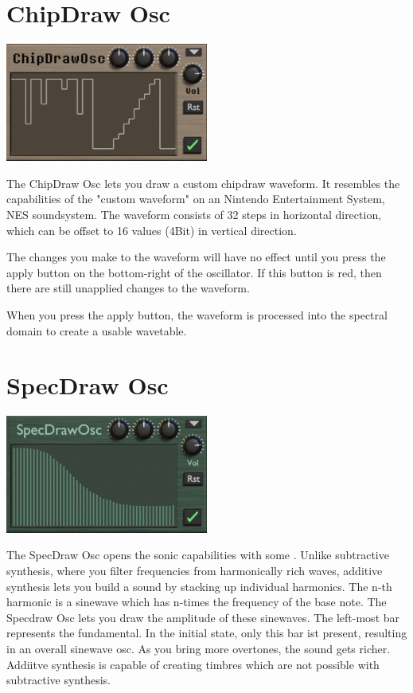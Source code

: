 \section{ChipDraw Osc}
\label{chipdraw}
\begin{center}
    \includegraphics[width=0.5\textwidth]{graphics/chipdraw_osc.png}
\end{center}
The ChipDraw Osc lets you draw a custom chipdraw waveform. It resembles the capabilities of the "custom waveform" on an Nintendo Entertainment System, NES soundsystem. The waveform consists of 32 steps in horizontal direction, which can be offset to 16 values (4Bit) in vertical direction.

\begin{tcolorbox}[colback=yellow!10!white,
        colframe=white!20!black,
        center,
        valign=top,
        halign=left,
        center title,
        width=\textwidth]

    The changes you make to the waveform will have no effect until you press the apply button on the bottom-right of the oscillator. If this button is red, then there are still unapplied changes to the waveform.
\end{tcolorbox}

When you press the apply button, the waveform is processed into the spectral domain to create a usable wavetable.

\section{SpecDraw Osc}
\begin{center}
    \includegraphics[width=0.5\textwidth]{graphics/specdraw_osc.png}
\end{center}
The SpecDraw Osc opens the sonic capabilities with some . Unlike subtractive synthesis, where you filter frequencies from harmonically rich waves, additive synthesis lets you build a sound by stacking up individual harmonics. The n-th harmonic is a sinewave which has n-times the frequency of the base note. The Specdraw Osc lets you draw the amplitude of these sinewaves. The left-most bar represents the fundamental. In the initial state, only this bar ist present, resulting in an overall sinewave osc. As you bring more overtones, the sound gets richer. Addiitve synthesis is capable of creating timbres which are not possible with subtractive synthesis.

